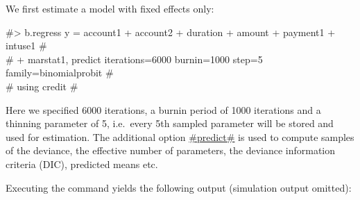 We first estimate a model with fixed effects only:

#> b.regress  y = account1 + account2 + duration + amount + payment1 + intuse1 #\\
#  + marstat1, predict iterations=6000 burnin=1000 step=5 family=binomialprobit # \\
#  using credit #

Here we specified 6000 iterations, a burnin period of 1000
iterations and a thinning parameter of 5, i.e.~every 5th sampled
parameter will be stored and used for estimation. The additional
option \hyperref[predict]{#predict#} is used to compute samples of
the deviance, the effective number of parameters, the deviance
information criteria (DIC), predicted means etc.

Executing the command yields the following output (simulation output
omitted):

\small

